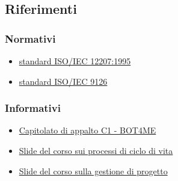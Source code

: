 \subsection{Riferimenti}

\subsubsection{Normativi}
\begin{itemize}
	\item \href{https://www.iso.org/standard/21208.html}{\color{blue} standard ISO/IEC 12207:1995}
    \item \href{https://www.iso.org/standard/22749.html}{\color{blue} standard ISO/IEC 9126}
\end{itemize}

\subsubsection{Informativi}
\begin{itemize}
	\item \href{https://www.math.unipd.it/~tullio/IS-1/2021/Progetto/C1.pdf}{\color{blue} Capitolato di appalto C1 - BOT4ME}
    \item \href{https://www.math.unipd.it/~tullio/IS-1/2021/Dispense/T03.pdf}{\color{blue} Slide del corso sui processi di ciclo di vita}
    \item \href{https://www.math.unipd.it/~tullio/IS-1/2021/Dispense/T06.pdf}{\color{blue} Slide del corso sulla gestione di progetto}
\end{itemize}
\newpage